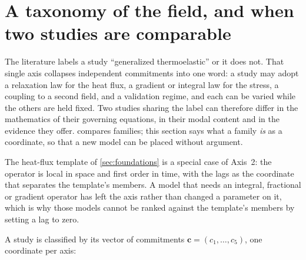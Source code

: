 
\section{A taxonomy of the field, and when two studies are comparable}\label{sec:taxonomy}

The literature labels a study ``generalized thermoelastic'' or it does not. That single axis collapses
independent commitments into one word: a study may adopt a relaxation law for the heat flux, a gradient or
integral law for the stress, a coupling to a second field, and a validation regime, and each can be varied
while the others are held fixed. Two studies sharing the label can therefore differ in the mathematics of
their governing equations, in their modal content and in the evidence they offer. 
compares families; this section says what a family \emph{is} as a coordinate, so that a new model can be
placed without argument.

The heat-flux template of \cref{sec:foundations} is a special case of Axis~2: the operator is local in
space and first order in time, with the lags as the coordinate that separates the template's members. A
model that needs an integral, fractional or gradient operator has left the axis rather than changed a
parameter on it, which is why those models cannot be ranked against the template's members by setting a
lag to zero.

A study is classified by its vector of commitments $\mathbf{c}=(c_1,\dots,c_5)$, one coordinate per axis:

